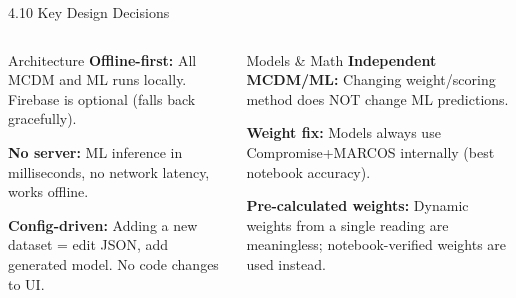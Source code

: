 \documentclass[aspectratio=169]{beamer}
\begin{document}
\begin{frame}[allowframebreaks]{4.10 Key Design Decisions}
  \begin{columns}
    \begin{block}{Architecture}
      \textbf{Offline-first:} All MCDM and ML runs locally.
      Firebase is optional (falls back gracefully).

      \vspace{0.2cm}
      \textbf{No server:} ML inference in milliseconds,
      no network latency, works offline.

      \vspace{0.2cm}
      \textbf{Config-driven:} Adding a new dataset = edit JSON,
      add generated model. No code changes to UI.
    \end{block}

    \begin{block}{Models \& Math}
      \textbf{Independent MCDM/ML:} Changing weight/scoring
      method does NOT change ML predictions.

      \vspace{0.2cm}
      \textbf{Weight fix:} Models always use
      Compromise+MARCOS internally (best notebook accuracy).

      \vspace{0.2cm}
      \textbf{Pre-calculated weights:} Dynamic weights from
      a single reading are meaningless; notebook-verified
      weights are used instead.
    \end{block}
  \end{columns}
\end{frame}
\end{document}
